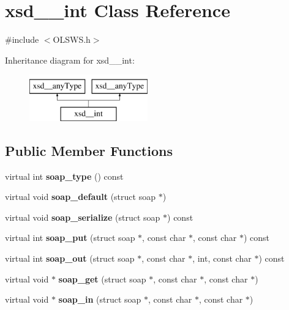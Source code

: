 \hypertarget{classxsd____int}{
\section{xsd\_\-\_\-int Class Reference}
\label{classxsd____int}
}


{\ttfamily \#include $<$OLSWS.h$>$}

Inheritance diagram for xsd\_\-\_\-int:\begin{figure}[H]
\begin{center}
\leavevmode
\includegraphics[height=2.000000cm]{classxsd____int}
\end{center}
\end{figure}
\subsection*{Public Member Functions}
\begin{DoxyCompactItemize}
\item 
\hypertarget{classxsd____int_a25db4206f6dc0e3fa54561bab5b92e19}{
virtual int {\bfseries soap\_\-type} () const }
\label{classxsd____int_a25db4206f6dc0e3fa54561bab5b92e19}

\item 
\hypertarget{classxsd____int_a3b90c5d422f8af42c8e2484c9e6afa17}{
virtual void {\bfseries soap\_\-default} (struct soap $\ast$)}
\label{classxsd____int_a3b90c5d422f8af42c8e2484c9e6afa17}

\item 
\hypertarget{classxsd____int_ac15fc0882a59a7bf356c487b4d480bf1}{
virtual void {\bfseries soap\_\-serialize} (struct soap $\ast$) const }
\label{classxsd____int_ac15fc0882a59a7bf356c487b4d480bf1}

\item 
\hypertarget{classxsd____int_a60baf478a60e4552fd65d6a72d3f7b16}{
virtual int {\bfseries soap\_\-put} (struct soap $\ast$, const char $\ast$, const char $\ast$) const }
\label{classxsd____int_a60baf478a60e4552fd65d6a72d3f7b16}

\item 
\hypertarget{classxsd____int_afe8064348f9b742a5dcab84d4a7cae9b}{
virtual int {\bfseries soap\_\-out} (struct soap $\ast$, const char $\ast$, int, const char $\ast$) const }
\label{classxsd____int_afe8064348f9b742a5dcab84d4a7cae9b}

\item 
\hypertarget{classxsd____int_abd00418f873f83d0bea1f24fefd0aa08}{
virtual void $\ast$ {\bfseries soap\_\-get} (struct soap $\ast$, const char $\ast$, const char $\ast$)}
\label{classxsd____int_abd00418f873f83d0bea1f24fefd0aa08}

\item 
\hypertarget{classxsd____int_ad7daa34d2aba047e10f07cbcf26cc7e3}{
virtual void $\ast$ {\bfseries soap\_\-in} (struct soap $\ast$, const char $\ast$, const char $\ast$)}
\label{classxsd____int_ad7daa34d2aba047e10f07cbcf26cc7e3}

\end{DoxyCompactItemize}
